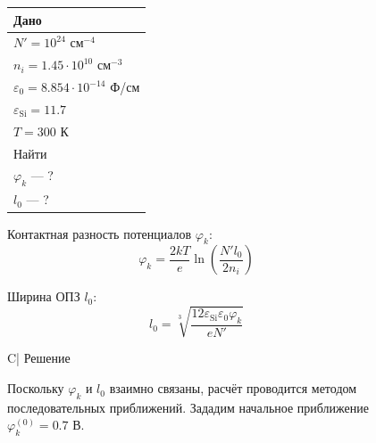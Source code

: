 \documentclass[12pt,a4paper]{article}
\theoremstyle{plain}
\theoremstyle{definition}
\theoremstyle{remark}
\numberwithin{equation}{section}
\begin{document}
\begin{figure}[H]
    \centering
    \begin{minipage}[t]{0.32\textwidth}
    \vspace{0em}
    \begin{tabularx}{\textwidth}{|X|}
        \hline
        \multicolumn{1}{|C|}{Дано} \\
        \hline
        $N' = 10^{24}$ см$^{-4}$ \\
        $n_i = 1.45 \cdot 10^{10}$ см$^{-3}$ \\
        $\varepsilon_0 = 8.854 \cdot 10^{-14}$ Ф/см \\
        $\varepsilon_\text{Si} = 11.7$ \\
        $T = 300$ К \\
        \hline
        \multicolumn{1}{|C|}{Найти} \\
        \hline
        $\varphi_k$ — ? \\
        $l_0$ — ? \\
        \hline
    \end{tabularx}

    \vspace{1em}
    Контактная разность потенциалов $\varphi_k$:
    \begin{equation*}
        \varphi_k = \frac{2kT}{e}\ln\left(\frac{N' l_0}{2n_i}\right)
    \end{equation*}

    Ширина ОПЗ $l_0$:
    \begin{equation*}
        l_0 = \sqrt[3]{\frac{12\varepsilon_\text{Si}\varepsilon_0\varphi_k}{e N'}}
    \end{equation*}

    \end{minipage}\hfill\begin{minipage}[t]{0.66\textwidth}
        \vspace{0em}
        \begin{tabularx}{\textwidth}{C|}
            \hline
            Решение \\
            \hline
        \end{tabularx}

        \vspace{0.5em}
        \hspace{0.025\textwidth}
        \begin{minipage}[t]{0.95\textwidth}
            Поскольку $\varphi_k$ и $l_0$ взаимно связаны, расчёт проводится методом последовательных приближений. Зададим начальное приближение $\varphi_k^{(0)} = 0.7\text{ В}$.


\end{minipage}
\end{minipage}
\end{figure}
\end{document}
